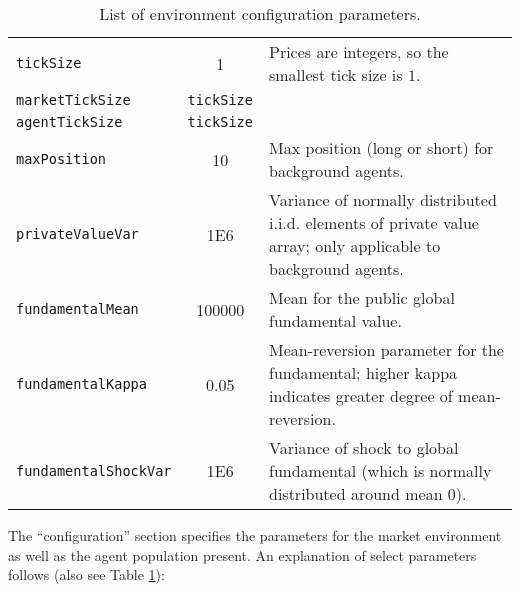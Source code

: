 \documentclass[11pt]{article}
\begin{document}
\begin{table}
\begin{tabular}[f]{p{} c p{}}
\verb|tickSize| 		& 1 & Prices are integers, so the smallest tick size is $1$. \\
\verb|marketTickSize| & \verb|tickSize|& \\
\verb|agentTickSize| & \verb|tickSize|& \\

\verb|maxPosition| 	& 10 & Max position (long or short) for background agents. \\
\verb|privateValueVar| & 1E6 & Variance of normally distributed i.i.d. elements of private value array; only applicable to background agents. \\
\verb|fundamentalMean| 	& 100000 & Mean for the public global fundamental value.\\
\verb|fundamentalKappa| 		& 0.05 & Mean-reversion parameter for the fundamental; higher kappa indicates greater degree of mean-reversion.\\
\verb|fundamentalShockVar| 		& 1E6 & Variance of shock to global fundamental (which is normally distributed around mean 0).\\



\end{tabular}
\caption{List of environment configuration parameters.}
\label{tab:configs}
\end{table}

The ``configuration'' section specifies the parameters for the market environment as well as the agent population present.
%
An explanation of select parameters follows (also see Table \ref{tab:configs}):
\end{document}
